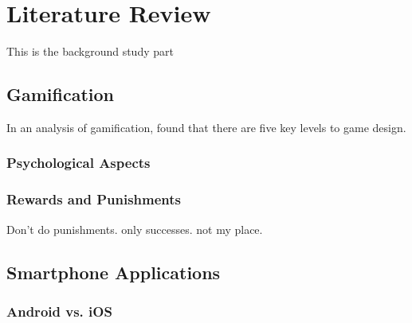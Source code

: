 
\chapter{Literature Review}
\label{chap:litReview}
This is the background study part



\section{Gamification}
In an analysis of gamification, \cite{Deterding:2011:GDE:2181037.2181040} found that there are five key levels to game design.

\subsection{Psychological Aspects}

\subsection{Rewards and Punishments}
Don't do punishments. only successes. not my place.

\section{Smartphone Applications}

\subsection{Android vs. iOS}

\subsection{}